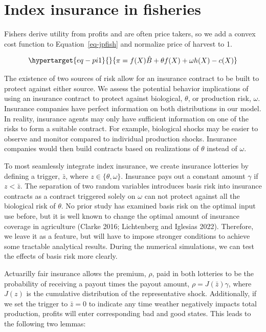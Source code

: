 \documentclass[
  letterpaper,
  DIV=11,
  numbers=noendperiod]{scrartcl}
\theoremstyle{plain}
\theoremstyle{plain}
\theoremstyle{remark}
\begin{document}
\hypertarget{sec-common}{%
\section{Index insurance in fisheries}\label{sec-common}}

Fishers derive utility from profits and are often price takers, so we
add a convex cost function to Equation~\ref{eq-jpfish} and normalize
price of harvest to 1.

\begin{equation}\protect\hypertarget{eq-pi1}{}{
\begin{aligned}
\pi=f(X)\hat{B}+\theta f(X)+\omega h(X)-c(X)
\end{aligned}
}\label{eq-pi1}\end{equation}

The existence of two sources of risk allow for an insurance contract to
be built to protect against either source. We assess the potential
behavior implications of using an insurance contract to protect against
biological, \(\theta\), or production risk, \(\omega\). Insurance
companies have perfect information on both distributions in our model.
In reality, insurance agents may only have sufficient information on one
of the risks to form a suitable contract. For example, biological shocks
may be easier to observe and monitor compared to individual production
shocks. Insurance companies would then build contracts based on
realizations of \(\theta\) instead of \(\omega\).

To most seamlessly integrate index insurance, we create insurance
lotteries by defining a trigger, \(\bar z\), where
\(z\in\{\theta,\omega\}\). Insurance pays out a constant amount
\(\gamma\) if \(z<\bar z\). The separation of two random variables
introduces basis risk into insurance contracts as a contract triggered
solely on \(\omega\) can not protect against all the biological risk of
\(\theta\). No prior study has examined basis risk on the optimal input
use before, but it is well known to change the optimal amount of
insurance coverage in agriculture (Clarke 2016; Lichtenberg and Iglesias
2022). Therefore, we leave it as a feature, but will have to impose
stronger conditions to achieve some tractable analytical results. During
the numerical simulations, we can test the effects of basis risk more
clearly.

Actuarilly fair insurance allows the premium, \(\rho\), paid in both
lotteries to be the probability of receiving a payout times the payout
amount, \(\rho=J(\bar z)\gamma\), where \(J(z)\) is the cumulative
distribution of the representative shock. Additionally, if we set the
trigger to \(\bar z=0\) to indicate any time weather negatively impacts
total production, profits will enter corresponding bad and good states.
This leads to the following two lemmas:
\end{document}
